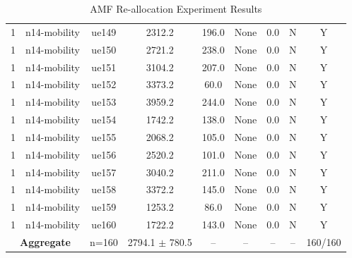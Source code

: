 \begin{table}[ht]
\begin{tabular}{|c|c|c|c|c|c|c|c|c|}
1 & n14-mobility & ue149 & 2312.2 & 196.0 & None & 0.0 & N & Y \\
1 & n14-mobility & ue150 & 2721.2 & 238.0 & None & 0.0 & N & Y \\
1 & n14-mobility & ue151 & 3104.2 & 207.0 & None & 0.0 & N & Y \\
1 & n14-mobility & ue152 & 3373.2 & 60.0 & None & 0.0 & N & Y \\
1 & n14-mobility & ue153 & 3959.2 & 244.0 & None & 0.0 & N & Y \\
1 & n14-mobility & ue154 & 1742.2 & 138.0 & None & 0.0 & N & Y \\
1 & n14-mobility & ue155 & 2068.2 & 105.0 & None & 0.0 & N & Y \\
1 & n14-mobility & ue156 & 2520.2 & 101.0 & None & 0.0 & N & Y \\
1 & n14-mobility & ue157 & 3040.2 & 211.0 & None & 0.0 & N & Y \\
1 & n14-mobility & ue158 & 3372.2 & 145.0 & None & 0.0 & N & Y \\
1 & n14-mobility & ue159 & 1253.2 & 86.0 & None & 0.0 & N & Y \\
1 & n14-mobility & ue160 & 1722.2 & 143.0 & None & 0.0 & N & Y \\
\multicolumn{2}{|c|}{\textbf{Aggregate}} & n=160 & 2794.1 $\pm$ 780.5 & -- & -- & -- & -- & 160/160 \\
\hline
\end{tabular}
\caption{AMF Re-allocation Experiment Results}
\label{tab:amf_realloc}
\end{table}
